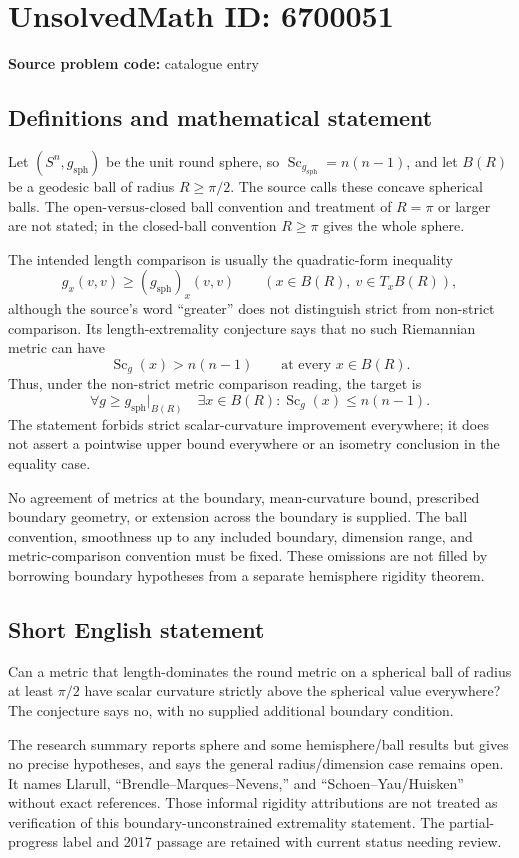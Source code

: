 \documentclass[11pt]{article}
\begin{document}
\section*{UnsolvedMath ID: 6700051}
\textbf{Source problem code:} catalogue entry
\subsection{Definitions and mathematical statement}
Let $(S^n,g_{\mathrm{sph}})$ be the unit round sphere, so $\operatorname{Sc}_{g_{\mathrm{sph}}}=n(n-1)$, and let $B(R)$ be a geodesic ball of radius $R\ge\pi/2$. The source calls these concave spherical balls. The open-versus-closed ball convention and treatment of $R=\pi$ or larger are not stated; in the closed-ball convention $R\ge\pi$ gives the whole sphere.

The intended length comparison is usually the quadratic-form inequality
\[
 g_x(v,v)\ge(g_{\mathrm{sph}})_x(v,v)
 \qquad(x\in B(R),\ v\in T_xB(R)),
\]
although the source's word ``greater'' does not distinguish strict from non-strict comparison. Its length-extremality conjecture says that no such Riemannian metric can have
\[
 \operatorname{Sc}_g(x)>n(n-1)\qquad\text{at every }x\in B(R).
\]
Thus, under the non-strict metric comparison reading, the target is
\[
 \forall g\ge g_{\mathrm{sph}}|_{B(R)}\quad
 \exists x\in B(R):\operatorname{Sc}_g(x)\le n(n-1).
\]
The statement forbids strict scalar-curvature improvement everywhere; it does not assert a pointwise upper bound everywhere or an isometry conclusion in the equality case.

No agreement of metrics at the boundary, mean-curvature bound, prescribed boundary geometry, or extension across the boundary is supplied. The ball convention, smoothness up to any included boundary, dimension range, and metric-comparison convention must be fixed. These omissions are not filled by borrowing boundary hypotheses from a separate hemisphere rigidity theorem.
\subsection{Short English statement}
Can a metric that length-dominates the round metric on a spherical ball of radius at least $\pi/2$ have scalar curvature strictly above the spherical value everywhere? The conjecture says no, with no supplied additional boundary condition.

The research summary reports sphere and some hemisphere/ball results but gives no precise hypotheses, and says the general radius/dimension case remains open. It names Llarull, ``Brendle--Marques--Nevens,'' and ``Schoen--Yau/Huisken'' without exact references. Those informal rigidity attributions are not treated as verification of this boundary-unconstrained extremality statement. The partial-progress label and 2017 passage are retained with current status needing review.
\end{document}

